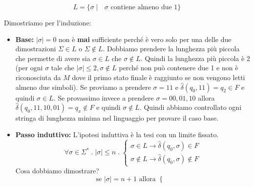 \documentclass[a4paper]{article}
\begin{document}
\ex{}
{
    \[L = \{\sigma \; | \; \text{ $\sigma$ contiene almeno due 1}\}\]
    \begin{figure}[H]
        \centering
      \end{figure}
    \noindent
    Dimostriamo per l'induzione:
    \begin{itemize}
        \item \textbf{Base:} $|\sigma| = 0$ non è \textbf{mai} sufficiente perché è vero solo
        per una delle due dimostrazioni $\Sigma \in L$ o $\Sigma \notin L$.
        Dobbiamo prendere la lunghezza più piccola che permette di avere sia $\sigma \in L$ che $\sigma \notin L$.
        Quindi la lunghezza più piccola è 2 (per ogni $\sigma$ tale che 
        $|\sigma| \le 2, \sigma \notin L$ perché non può contenere 
        due 1 e non è riconosciuta da $M$ dove il primo stato finale è raggiunto se
        non vengono letti almeno due simboli).
        Se proviamo a prendere $\sigma = 11$ e $\hat{\delta}(q_0, 11) = q_2 \in F$ e quindi $\sigma \in L$.
        Se provassimo invece a prendere $\sigma = 00, 01, 10$ allora $\hat{\delta}(q_0, 11,10,01) = q_x \notin F$ e quindi $\sigma \notin L$.
        Quindi abbiamo controllato ogni stringa di lunghezza minima nel linguaggio per provare il caso base.
        \item \textbf{Passo induttivo:} L'ipotesi induttiva è la tesi con un limite fissato.
        \[
        \forall \sigma \in \Sigma^* \; . \; |\sigma| \le n \; . \;
        \begin{cases}
            \sigma \in L \rightarrow \hat{\delta}(q_0, \sigma) \in F\\
        \sigma \notin L \rightarrow \hat{\delta}(q_0, \sigma) \notin F
        \end{cases}
        \]
        Cosa dobbiamo dimostrare?
        \[\text{se } |\sigma|= n+1 \text{ allora } \begin{cases}

\end{cases}\]
\end{itemize}}
\end{document}
